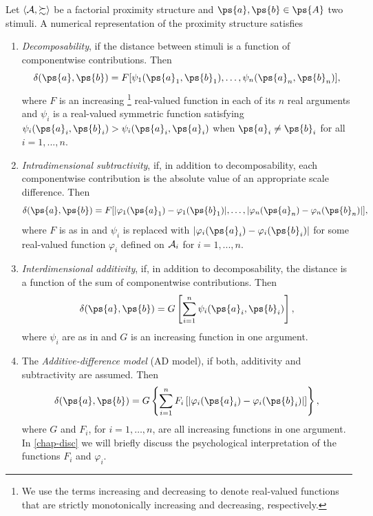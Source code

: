 \begin{defi}
  Let $\langle \mathcal{A}, \succsim \rangle$ be a factorial proximity structure and $\ps{a}, \ps{b} \in \ps{A}$ two stimuli. A numerical representation of the proximity structure satisfies
	\begin{enumerate}
    \item \emph{Decomposability}, if the distance between stimuli is a function of componentwise contributions. Then 
		      \begin{equation}\label{def-decomp}
            \metric(\ps{a},\ps{b}) = F[\psi_1(\ps{a}_1, \ps{b}_1), \ldots , \psi_n(\ps{a}_n, \ps{b}_n)],
		      \end{equation}
          where $F$ is an increasing \footnote{We use the terms increasing and decreasing to denote real-valued functions that are strictly monotonically increasing and decreasing, respectively.} real-valued function in each of its $n$ real arguments and $\psi_i$ is a real-valued symmetric function satisfying $\psi_i(\ps{a}_i, \ps{b}_i) > \psi_i(\ps{a}_i, \ps{a}_i)$ when $\ps{a}_i \neq \ps{b}_i$ for all $i = 1, ..., n$.
        \item \emph{Intradimensional subtractivity}, if, in addition to decomposability, each componentwise contribution is the absolute value of an appropriate scale difference. Then 
		      \begin{equation}\label{def-intradim-sub}
            \metric(\ps{a},\ps{b}) = F[ |\varphi_1(\ps{a}_1) - \varphi_1(\ps{b}_1)| , \ldots , | \varphi_n(\ps{a}_n) - \varphi_n(\ps{b}_n)| ],
		      \end{equation}
          where $F$ is as in  and $\psi_i$ is replaced with $|\varphi_i(\ps{a}_i) - \varphi_i(\ps{b}_i)|$ for some real-valued function $\varphi_i$ defined on $\mathcal{A}_i$ for $i = 1, ..., n$.
        \item \emph{Interdimensional additivity}, if, in addition to decomposability, the distance is a function of the sum of componentwise contributions. Then 
		      \begin{equation}\label{def-iterdim-add}
            \metric(\ps{a},\ps{b}) = G \left [ \sum_{i=1}^{n} \psi_i(\ps{a}_i, \ps{b}_i) \right],
		      \end{equation}
		      where $\psi_i$ are as in  and $G$ is an increasing function in one argument.
		\item The \emph{Additive-difference model} (AD model), if both, additivity and subtractivity are assumed. Then
      \begin{equation}\label{def-add-diff-model} \index{Additive-difference!model}
        \metric(\ps{a},\ps{b}) = G \left \{ \sum_{i=1}^{n} F_i\left [ | \varphi_i(\ps{a}_i) - \varphi_i(\ps{b}_i)| \right ] \right \},
		      \end{equation}
          where $G$ and $F_i$, for $i=1, \ldots ,n$, are all increasing functions in one argument. In \cref{chap-disc} we will briefly discuss the psychological interpretation of the functions $F_i$ and $\varphi_i$.
	\end{enumerate}
\end{defi}

